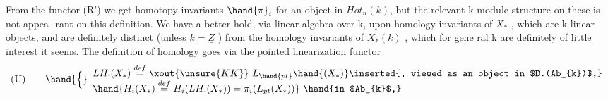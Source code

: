 From the  functor  (R')  we get homotopy invariants  $\hand{\pi}_{i}$ for an object
in  $Hot_{n}(k)$,  but the relevant k-module structure on these is not appea-%
rant on this definition.  We have a better hold,  via linear algebra over
k,  upon  homology invariants of $X_{*}$  ,  which are k-linear objects,  and
are definitely distinct (unless $k=\underline{Z}$ )  from the homology invariants of
$X_{*}(k)$ ,  which for gene ral k are definitely of little interest it seems.
The definition of homology goes via the pointed linearization functor \hand{:}
\[ \text{(U)} \qquad \hand{\Big\{} \begin{array}{l} LH.(X_{*}) \overset{def}{=} \xout{\unsure{KK}} \ L_{\hand{pt}}\hand{(X_{*})} \inserted{, viewed as an object in $D.(Ab_{k})$,} \\ \hand{H_{i}(X_{*}) \overset{def}{=} H_{i}(LH.(X_{*})) = \pi_{i}(L_{pt}(X_{*}))} \ \hand{in $Ab_{k}$,} \end{array} \]

